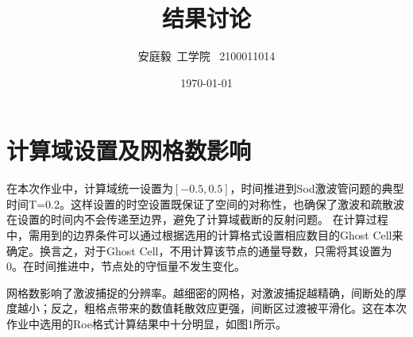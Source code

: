 \documentclass[12pt, a4paper]{article}
\title{结果讨论}
\author{安庭毅\ 工学院 \ 2100011014}
\date{\today} %
\begin{document}
\maketitle %
\section{计算域设置及网格数影响}
在本次作业中，计算域统一设置为$[-0.5,0.5]$，时间推进到Sod激波管问题的典型时间T=0.2。这样设置的时空设置既保证了空间的对称性，也确保了激波和疏散波在设置的时间内不会传递至边界，避免了计算域截断的反射问题。
在计算过程中，需用到的边界条件可以通过根据选用的计算格式设置相应数目的Ghost Cell来确定。换言之，对于Ghost Cell，不用计算该节点的通量导数，只需将其设置为0。在时间推进中，节点处的守恒量不发生变化。

网格数影响了激波捕捉的分辨率。越细密的网格，对激波捕捉越精确，间断处的厚度越小；反之，粗格点带来的数值耗散效应更强，间断区过渡被平滑化。这在本次作业中选用的Roe格式计算结果中十分明显，如图1所示。
\end{document}
